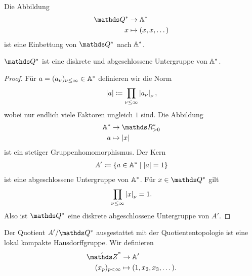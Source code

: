 Die Abbildung
\begin{align*}
\Q^\ast &\to \A^\ast\\
x&\mapsto (x,x,\dots)
\end{align*}
ist eine Einbettung von $\Q^\ast$ nach $\mathbb{A}^\ast$.

\begin{prop}
$\Q^\ast$ ist eine diskrete und abgeschlossene Untergruppe von $\mathbb{A}^\ast$.
\end{prop}
\begin{proof}
Für $a=(a_\nu)_{\nu \leq \infty} \in \mathbb{A}^\ast$ definieren wir die Norm
\begin{align*}
\left\vert a\right\vert\coloneqq \prod_{\nu \leq \infty} \left\vert a_\nu\right\vert_\nu,
\end{align*}
wobei nur endlich viele Faktoren ungleich $1$ sind.
Die Abbildung
\begin{align*}
\A^\ast &\to \R_{>0}^\ast\\
a &\mapsto \abs{x}
\end{align*}
ist ein stetiger Gruppenhomomorphismus.
Der Kern
\begin{align*}
A'\coloneqq \{a \in \mathbb{A}^\ast \mid \left\vert a\right\vert=1\}
\end{align*}
ist eine abgeschlossene Untergruppe von $\mathbb{A}^\ast$.
Für $x \in \Q^\ast$ gilt
\begin{align*}
\prod_{\nu \leq \infty} \left\vert x\right\vert_\nu=1.
\end{align*}
Also ist $\Q^\ast$ eine diskrete abgeschlossene Untergruppe von $A'$.
\end{proof}

Der Quotient $A'/\Q^\ast$ ausgestattet mit der Quotiententopologie ist eine lokal kompakte Hausdorffgruppe.
Wir definieren
\begin{align*}
\hat{\Z}^\ast &\to \A'\\
(x_p)_{p<\infty} &\mapsto (1,x_2,x_3,\dots).
\end{align*}

